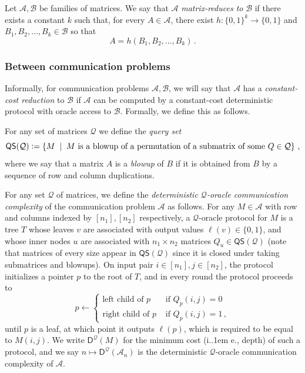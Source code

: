 \documentclass{article}
\makeatletter
\newcommand{\define}{\vcentcolon=}
\newcommand{\zo}{\{0,1\}}
\newcommand{\cA}{\ensuremath{\mathcal{A}}}
\newcommand{\cB}{\ensuremath{\mathcal{B}}}
\newcommand{\cQ}{\ensuremath{\mathcal{Q}}}
\newcommand*\ie{i.\kern.1em e.\@\xspace} %
\makeatother
\begin{document}
\begin{definition}
\label{def:matrix-reductions}
Let $\cA, \cB$ be families of matrices. We say that $\cA$ \emph{matrix-reduces to} $\cB$ if there
exists a constant $k$ such that, for every $A \in \cA$, there
exist $h : \zo^k \to \zo$ and $B_1, B_2, \dotsc, B_k \in \cB$ so that
\[
  A = h(B_1, B_2, \dotsc, B_k) \,.
\]
\end{definition}


\subsubsection{Between communication problems}
\newcommand{\QS}{\mathsf{QS}}
\newcommand{\D}{\mathsf{D}}

Informally, for communication problems $\cA, \cB$, we will say that $\cA$ has a \emph{constant-cost
reduction} to $\cB$ if $\cA$ can be computed by a constant-cost deterministic protocol with oracle
access to $\cB$.  Formally, we define this as follows.

\begin{definition}
\label{def:query-set}
For any set of matrices $\cQ$ we define the \emph{query set}
\[
\QS(\cQ) \define \left\{ M \;\mid\; M \text{ is a blowup of a permutation of a submatrix of some } Q \in \cQ
\right\} \,,
\]
where we say that a matrix $A$ is a \emph{blowup} of $B$ if it is obtained from $B$ by a sequence of row and
column duplications.
\end{definition}

\begin{definition}
\label{def:oracle-communication}
For any set $\cQ$ of matrices, we define the \emph{deterministic $\cQ$-oracle communication
complexity} of the communication problem $\cA$ as follows. For any $M \in \cA$ with row and columns
indexed by $[n_1], [n_2]$ respectively, a $\cQ$-oracle protocol for $M$ is a tree $T$ whose leaves
$v$ are associated with output values $\ell(v) \in \zo$, and whose inner nodes $u$ are associated
with $n_1 \times n_2$ matrices $Q_u \in \QS(\cQ)$ (note that matrices of every size appear in
$\QS(\cQ)$ since it is closed under taking submatrices and blowups). On input pair $i \in [n_1], j \in [n_2]$,
the protocol initializes a pointer $p$ to the root of $T$, and in every round the protocol proceeds
to
\[
  p \gets \begin{cases}
    \text{left child of $p$} &\text{ if } Q_p(i, j) = 0 \\
    \text{right child of $p$} &\text{ if } Q_p(i, j) = 1 \,,
  \end{cases}
\]
until $p$ is a leaf, at which point it outputs $\ell(p)$, which is required to be equal to $M(i,j)$.
We write $\D^\cQ(M)$ for the minimum cost (\ie, depth) of such a protocol, and we say $n \mapsto
\D^\cQ(\cA_n)$ is the deterministic $\cQ$-oracle communication complexity of $\cA$.
\end{definition}
\end{document}
